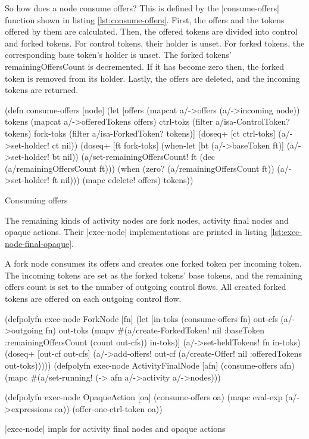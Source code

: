 \documentclass[submission]{eptcs}
\newcommand{\code}{\clojureinline}
\begin{document}
So how does a node consume offers?  This is defined by the
\code|consume-offers| function shown in listing \vref{lst:consume-offers}.
First, the offers and the tokens offered by them are calculated.  Then, the
offered tokens are divided into control and forked tokens.  For control tokens,
their holder is unset.  For forked tokens, the corresponding base token's
holder is unset.  The forked tokens' \textsf{remainingOffersCount} is
decremented.  If it has become zero then, the forked token is removed from its
holder.  Lastly, the offers are deleted, and the incoming tokens are returned.

\begin{listing}[h!tb]
\begin{clojurecode}
(defn consume-offers [node]
  (let [offers    (mapcat a/->offers (a/->incoming node))
        tokens    (mapcat a/->offeredTokens offers)
        ctrl-toks (filter a/isa-ControlToken? tokens)
        fork-toks (filter a/isa-ForkedToken? tokens)]
    (doseq+ [ct ctrl-toks]
      (a/->set-holder! ct nil))
    (doseq+ [ft fork-toks]
      (when-let [bt (a/->baseToken ft)]
        (a/->set-holder! bt nil))
      (a/set-remainingOffersCount! ft (dec (a/remainingOffersCount ft)))
      (when (zero? (a/remainingOffersCount ft))
        (a/->set-holder! ft nil)))
    (mapc edelete! offers)
    tokens))
\end{clojurecode}
\caption{Consuming offers}
\label{lst:consume-offers}
\end{listing}

The remaining kinds of activity nodes are fork nodes, activity final nodes and
opaque actions.  Their \code|exec-node| implementations are printed in listing
\vref{lst:exec-node-final-opaque}.

A fork node consumes its offers and creates one forked token per incoming
token.  The incoming tokens are set as the forked tokens' base tokens, and the
remaining offers count is set to the number of outgoing control flows.  All
created forked tokens are offered on each outgoing control flow.

\begin{listing}[h!tb]
\begin{clojurecode}
(defpolyfn exec-node ForkNode [fn]
  (let [in-toks  (consume-offers fn)
        out-cfs  (a/->outgoing fn)
        out-toks (mapv #(a/create-ForkedToken!
                         nil {:baseToken %
                              :remainingOffersCount (count out-cfs)})
                       in-toks)]
    (a/->set-heldTokens! fn in-toks)
    (doseq+ [out-cf out-cfs]
      (a/->add-offers! out-cf (a/create-Offer!
                               nil {:offeredTokens out-toks})))))
(defpolyfn exec-node ActivityFinalNode [afn]
  (consume-offers afn)
  (mapc #(a/set-running! %
        (-> afn a/->activity a/->nodes)))

(defpolyfn exec-node OpaqueAction [oa]
  (consume-offers oa)
  (mapc eval-exp (a/->expressions oa))
  (offer-one-ctrl-token oa))
\end{clojurecode}
\caption{\code|exec-node| impls for activity final nodes and opaque actions}
\label{lst:exec-node-final-opaque}
\end{listing}
\end{document}
